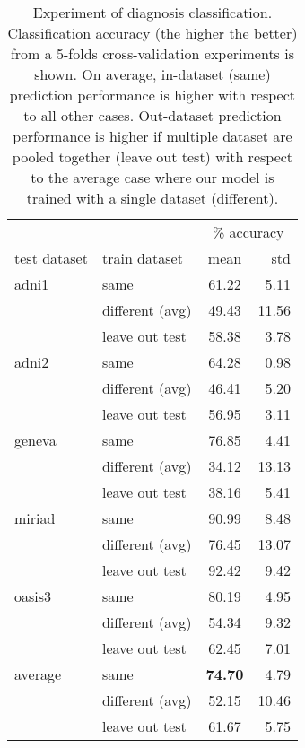 \begin{table}
\centering
\caption{
Experiment of diagnosis classification.
Classification accuracy (the higher the better) from a 5-folds cross-validation experiments is shown.
On average, in-dataset (same) prediction performance is higher with respect to all other cases.
Out-dataset prediction performance is higher if multiple dataset are pooled together (leave out test) with respect to the 
average case where our model is trained with a single dataset (different).
}
\begin{tabular}{llcr}
\toprule
       &      &            \multicolumn{2}{c}{\% accuracy} \\
test dataset & train dataset & mean & std \\
\midrule
adni1  & same            &  61.22 & 5.11 \\
       & different (avg) &  49.43 & 11.56 \\
       & leave out test  &  58.38 & 3.78 \\
\midrule
adni2  & same            &  64.28 & 0.98 \\
       & different (avg) &  46.41 & 5.20 \\
       & leave out test  &  56.95 & 3.11 \\
\midrule
geneva & same            &  76.85 & 4.41 \\
       & different (avg) &  34.12 & 13.13 \\
       & leave out test  &  38.16 & 5.41 \\
\midrule
miriad & same            &  90.99 & 8.48 \\
       & different (avg) &  76.45 & 13.07 \\
       & leave out test  &  92.42 & 9.42 \\
\midrule
oasis3 & same            &  80.19 & 4.95 \\
       & different (avg) &  54.34 & 9.32 \\
       & leave out test  &  62.45 & 7.01 \\
\midrule
\midrule
average& same            &  \textbf{74.70} & 4.79 \\
       & different (avg) &  52.15 & 10.46 \\
       & leave out test  &  61.67 & 5.75 \\
\bottomrule
\end{tabular}
\end{table}
